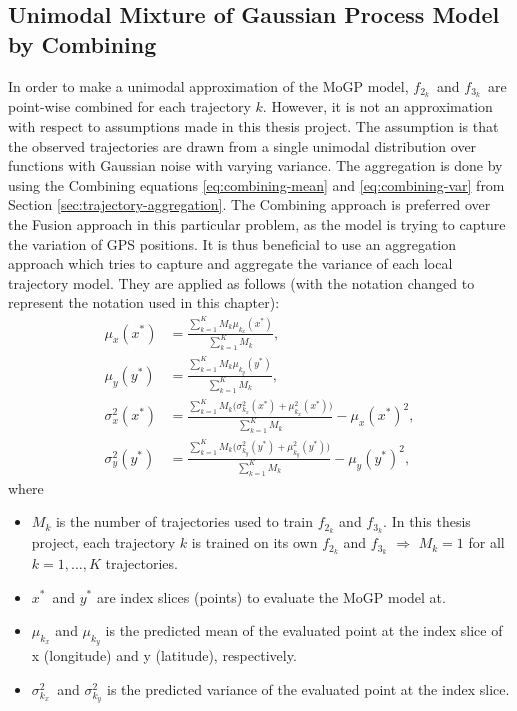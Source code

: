 \subsection{Unimodal Mixture of Gaussian Process Model by Combining}
In order to make a unimodal approximation of the MoGP model, $f_{2_k}$ and $f_{3_k}$ are point-wise combined for each trajectory $k$.
However, it is not an approximation with respect to assumptions made in this thesis project.
The assumption is that the observed trajectories are drawn from a single unimodal distribution over functions with Gaussian noise with varying variance.
The aggregation is done by using the Combining equations \ref{eq:combining-mean} and \ref{eq:combining-var} from Section \ref{sec:trajectory-aggregation}.
The Combining approach is preferred over the Fusion approach in this particular problem, as the model is trying to capture the variation of GPS positions.
It is thus beneficial to use an aggregation approach which tries to capture and aggregate the variance of each local trajectory model.
They are applied as follows (with the notation changed to represent the notation used in this chapter):
\begin{align}
    \mu_x(x^*) &= \frac{\sum_{k=1}^{K} M_k\mu_{k_x}(x^*)}{\sum_{k=1}^{K} M_k}, \label{eq:combined-mu-x} \\
    \mu_y(y^*) &= \frac{\sum_{k=1}^{K} M_k\mu_{k_y}(y^*)}{\sum_{k=1}^{K} M_k}, \label{eq:combined-mu-y} \\
    \sigma_x^2(x^*) &= \frac{\sum_{k=1}^{K} M_k\Big(\sigma_{k_x}^2(x^*) + \mu_{k_x}^2(x^*)\Big)}{\sum_{k=1}^{K} M_k} - \mu_x(x^*)^2, \label{eq:combined-var-x} \\
    \sigma_y^2(y^*) &= \frac{\sum_{k=1}^{K} M_k\Big(\sigma_{k_y}^2(y^*) + \mu_{k_y}^2(y^*)\Big)}{\sum_{k=1}^{K} M_k} - \mu_y(y^*)^2, \label{eq:combined-var-y}
\end{align}
where
\begin{itemize}
    \item $M_k$ is the number of trajectories used to train $f_{2_k}$ and $f_{3_k}$.
    In this thesis project, each trajectory $k$ is trained on its own $f_{2_k}$ and $f_{3_k}$ $\Rightarrow$ $M_k = 1$ for all $k = 1,\dotso,K$ trajectories.
    \item $x^*$ and $y^*$ are index slices (points) to evaluate the MoGP model at.
    \item $\mu_{k_x}$ and $\mu_{k_y}$ is the predicted mean of the evaluated point at the index slice of x (longitude) and y (latitude), respectively. 
    \item $\sigma_{k_x}^2$ and $\sigma_{k_y}^2$ is the predicted variance of the evaluated point at the index slice. 
\end{itemize}

